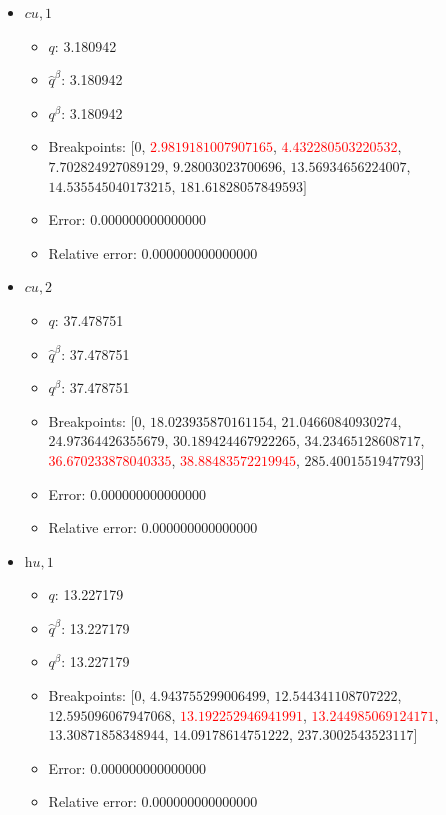 \documentclass{article}%
\begin{document}
\begin{itemize}
	\item $\textit{cu},1$%
	\begin{itemize}%
		\item $q$: 3.180942%
		\item $\hat{q}^\beta$: 3.180942%
		\item $q^\beta$: 3.180942%
		\item Breakpoints: $[$$0$, \textcolor{red}{$2.9819181007907165$}, \textcolor{red}{$4.432280503220532$}, $7.702824927089129$, $9.28003023700696$, $13.56934656224007$, $14.535545040173215$, $181.61828057849593$$]$%
		\item Error: 0.000000000000000%
		\item Relative error: 0.000000000000000%
	\end{itemize}%
	\item $\textit{cu},2$%
	\begin{itemize}%
		\item $q$: 37.478751%
		\item $\hat{q}^\beta$: 37.478751%
		\item $q^\beta$: 37.478751%
		\item Breakpoints: $[$$0$, $18.023935870161154$, $21.04660840930274$, $24.97364426355679$, $30.189424467922265$, $34.23465128608717$, \textcolor{red}{$36.670233878040335$}, \textcolor{red}{$38.88483572219945$}, $285.4001551947793$$]$%
		\item Error: 0.000000000000000%
		\item Relative error: 0.000000000000000%
	\end{itemize}%
	\item $\textit{hu},1$%
	\begin{itemize}%
		\item $q$: 13.227179%
		\item $\hat{q}^\beta$: 13.227179%
		\item $q^\beta$: 13.227179%
		\item Breakpoints: $[$$0$, $4.943755299006499$, $12.544341108707222$, $12.595096067947068$, \textcolor{red}{$13.192252946941991$}, \textcolor{red}{$13.244985069124171$}, $13.30871858348944$, $14.09178614751222$, $237.3002543523117$$]$%
		\item Error: 0.000000000000000%
		\item Relative error: 0.000000000000000%
	\end{itemize}%
\end{itemize}%
\end{document}
